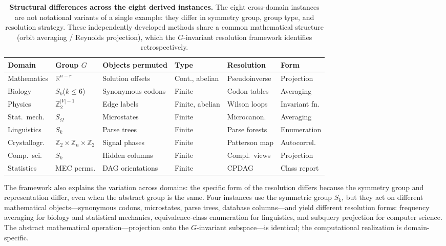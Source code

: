 \documentclass[11pt,a4paper]{article}
\newcommand{\R}{\mathbb{R}}
\begin{document}
\begin{table}[t]
\centering
\caption{\textbf{Structural differences across the eight derived instances.}
  The eight cross-domain instances are not notational variants of a single
  example: they differ in symmetry group, group type, and resolution strategy.
  These independently developed methods share a common mathematical
  structure (orbit averaging / Reynolds projection), which the
  $G$-invariant resolution framework identifies retrospectively.}
\label{tab:structural-differences}
\small
\setlength{\tabcolsep}{3pt}
\begin{tabular}{@{}llllll@{}}
\toprule
Domain & Group $G$ & Objects permuted & Type & Resolution & Form \\
\midrule
Mathematics
  & $\R^{n-r}$
  & Solution offsets
  & Cont., abelian
  & Pseudoinverse
  & Projection \\[2pt]
Biology
  & $S_k$\;($k{\leq}6$)
  & Synonymous codons
  & Finite
  & Codon tables
  & Averaging \\[2pt]
Physics
  & $\mathbb{Z}_2^{|V|-1}$
  & Edge labels
  & Finite, abelian
  & Wilson loops
  & Invariant fn. \\[2pt]
Stat.\ mech.
  & $S_\Omega$
  & Microstates
  & Finite
  & Microcanon.
  & Averaging \\[2pt]
Linguistics
  & $S_k$
  & Parse trees
  & Finite
  & Parse forests
  & Enumeration \\[2pt]
Crystallogr.
  & $\mathbb{Z}_2{\times}\mathbb{Z}_n{\times}\mathbb{Z}_2$
  & Signal phases
  & Finite
  & Patterson map
  & Autocorrel. \\[2pt]
Comp.\ sci.
  & $S_k$
  & Hidden columns
  & Finite
  & Compl.\ views
  & Projection \\[2pt]
Statistics
  & MEC perms.
  & DAG orientations
  & Finite
  & CPDAG
  & Class report \\
\bottomrule
\end{tabular}
\end{table}

The framework also explains the variation across domains: the specific form
of the resolution differs because the symmetry group and representation
differ, even when the abstract group is the same.  Four instances use the
symmetric group $S_k$, but they act on different mathematical
objects---synonymous codons, microstates, parse trees, database
columns---and yield different resolution forms: frequency averaging for
biology and statistical mechanics, equivalence-class enumeration for
linguistics, and subquery projection for computer science.  The abstract
mathematical operation---projection onto the $G$-invariant subspace---is
identical; the computational realization is domain-specific.
\end{document}
